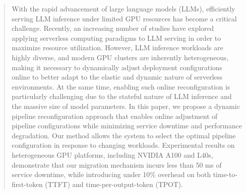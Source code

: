 \documentclass[sigplan,screen]{acmart}
\begin{document}
\begin{abstract}
With the rapid advancement of large language models (LLMs), efficiently serving LLM inference under limited GPU resources has become a critical challenge. Recently, an increasing number of studies have explored applying serverless computing paradigms to LLM serving in order to maximize resource utilization. However, LLM inference workloads are highly diverse, and modern GPU clusters are inherently heterogeneous, making it necessary to dynamically adjust deployment configurations online to better adapt to the elastic and dynamic nature of serverless environments. At the same time, enabling such online reconfiguration is particularly challenging due to the stateful nature of LLM inference and the massive size of model parameters. In this paper, we propose a dynamic pipeline reconfiguration approach that enables online adjustment of pipeline configurations while minimizing service downtime and performance degradation. Our method allows the system to select the optimal pipeline configuration in response to changing workloads. Experimental results on heterogeneous GPU platforms, including NVIDIA A100 and L40s, demonstrate that our migration mechanism incurs less than 50 ms of service downtime, while introducing under 10\% overhead on both time-to-first-token (TTFT) and time-per-output-token (TPOT).

\end{abstract}

\end{document}
